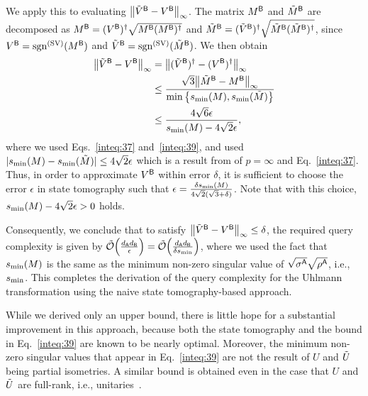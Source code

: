 We apply this to evaluating $\big\|\tilde{V}^{\mathsf{B}} -V^{\mathsf{B}}\big\|_\infty$.
The matrix $M^{\mathsf{B}}$ and $\tilde{M}^{\mathsf{B}}$ are decomposed as $M^{\mathsf{B}} = (V^{\mathsf{B}})^\dag\sqrt{M^{\mathsf{B}}(M^{\mathsf{B}})^\dag}$ and $\tilde{M}^{\mathsf{B}} = (\tilde{V}^{\mathsf{B}})^\dag\sqrt{\tilde{M}^{\mathsf{B}}(\tilde{M}^{\mathsf{B}})^\dag}$, since $V^{\mathsf{B}}=\mathrm{sgn}^{(\rm SV)}(M^{\mathsf{B}})$ and $\tilde{V}^{\mathsf{B}}=\mathrm{sgn}^{(\rm SV)}(\tilde{M}^{\mathsf{B}})$.
We then obtain 
\begin{align}
\label{inteq:38}
    \big\|\tilde{V}^{\mathsf{B}} - V^{\mathsf{B}}\big\|_\infty
    &= \big\|(\tilde{V}^{\mathsf{B}})^\dag - (V^{\mathsf{B}})^\dag\big\|_\infty \\
    &\leq \frac{\sqrt{3}\big\|\tilde{M}^{\mathsf{B}} - M^{\mathsf{B}}\big\|_\infty}{\min\big\{s_{\rm min}(M), s_{\rm min}(\tilde{M})\big\}} \\
    \label{inteq:87}
    &\leq \frac{4\sqrt{6}\epsilon}{s_{\rm min}(M) - 4\sqrt{2}\epsilon},
\end{align}
where we used Eqs.~\eqref{inteq:37} and~\eqref{inteq:39}, and used $|s_{\rm min}(M) - s_{\rm min}(\tilde{M})| \leq 4\sqrt{2}\epsilon$ which is a result from  of $p=\infty$ and Eq.~\eqref{inteq:37}.
Thus, in order to approximate $V^{\mathsf{B}}$ within error $\delta$, it is sufficient to choose the error $\epsilon$ in state tomography such that $\epsilon = \frac{\delta s_{\rm min}(M)}{4\sqrt{2}(\sqrt{3} + \delta)}$.
Note that with this choice, $s_{\rm min}(M) - 4\sqrt{2}\epsilon > 0$ holds.




Consequently, we conclude that to satisfy $\big\|\tilde{V}^{\mathsf{B}} - V^{\mathsf{B}}\big\|_\infty \leq \delta$, the required query complexity is given by $\tilde{{\mathcal{O}}}\Big(\frac{d_{\mathsf{A}} d_{\mathsf{B}}}{\epsilon}\Big) 
    = \tilde{{\mathcal{O}}}\Big(\frac{d_{\mathsf{A}} d_{\mathsf{B}}}{\delta s_{\rm min}}\Big)$, where we used the fact that $s_{\rm min}(M)$ is the same as the minimum non-zero singular value of $\sqrt{\sigma^{\mathsf{A}}}\sqrt{\rho^{\mathsf{A}}}$, i.e., $s_{\rm min}$.
This completes the derivation of the query complexity for the Uhlmann transformation using the naive state tomography-based approach.


While we derived only an upper bound, there is little hope for a substantial improvement in this approach, because both the state tomography and the bound in Eq.~\eqref{inteq:39} are known to be nearly optimal.
Moreover, the minimum non-zero singular values that appear in Eq.~\eqref{inteq:39} are not the result of $U$ and $\tilde{U}$ being partial isometries. A similar bound is obtained even in the case that $U$ and $\tilde{U}$ are full-rank, i.e., unitaries~\cite{chun1989perturbation, Barrlund1990PerturbOnPolar, Mathias1993perturbPDecomp, Li1995NewPerturbUnitary, bhatia2013matrix}. 






